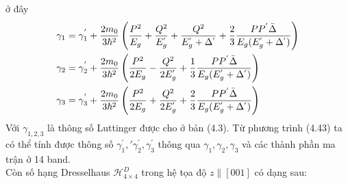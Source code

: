 ở đây
\begin{align}
\gamma_1 &=\gamma_1^{'} +\frac{2m_0}{3\hbar^2}\left(\frac{P^2}{E_g} +
 \frac{Q^2}{E_g^{'}}+\frac{Q^2}{E_g^{'}+\Delta^{'}}
  +\frac{2}{3}\frac{PP^{'}\bar{\Delta}}{E_g(E_g^{'} +\Delta^{'})}\right)\notag \\
  \gamma_2 &=\gamma_2^{'} +\frac{2m_0}{3\hbar^2}\left(\frac{P^2}{2E_g} -
 \frac{Q^2}{2E_g^{'}}
  +\frac{1}{3}\frac{PP^{'}\bar{\Delta}}{E_g(E_g^{'} +\Delta^{'})}\right)\notag \\
  \gamma_3 &=\gamma_3^{'} +\frac{2m_0}{3\hbar^2}\left(\frac{P^2}{2E_g} +
 \frac{Q^2}{2E_g^{'}}
  +\frac{2}{3}\frac{PP^{'}\bar{\Delta}}{E_g(E_g^{'} +\Delta^{'})}\right)
\end{align}
Với $\gamma_{1,2,3}$ là thông số Luttinger được cho ở bản (4.3). Từ phương trình (4.43) ta có thể tính được thông số $\gamma_1^{'},'\gamma_2^{'},\gamma_3^{'}$ thông qua $\gamma_1,\gamma_2,\gamma_3$ và các thành phần ma trận ở 14 band.\\
Còn số hạng Dresselhaus $\mathcal{H}_{4\times 4}^D$ trong hệ tọa độ $z\parallel[001]$ có dạng sau:
